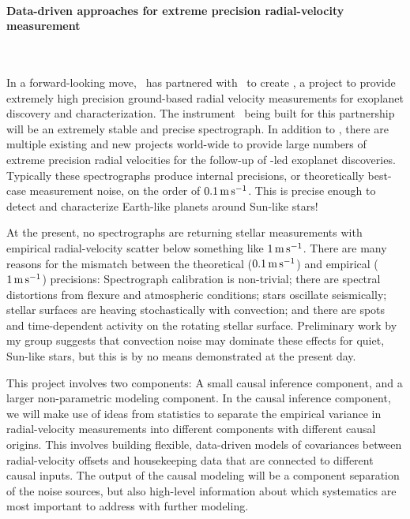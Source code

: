 \documentclass[12pt, fullpage, letterpaper]{article}
\begin{document}
\paragraph{Data-driven approaches for extreme precision radial-velocity measurement}
~

\bigskip
In a forward-looking move, \NASA\ has partnered with \NSF\ to create
\NNEXPLORE, a project to provide extremely high precision ground-based
radial velocity measurements for exoplanet discovery and
characterization. The instrument \NEID\ being built for this
partnership will be an extremely stable and precise spectrograph. In
addition to \NEID, there are multiple existing and new projects
world-wide to provide large numbers of extreme precision radial
velocities for the follow-up of \NASA-led exoplanet
discoveries. Typically these spectrographs produce internal
precisions, or theoretically best-case measurement noise, on the order
of $0.1\,{\mathrm{m\,s^{-1}}}$. This is precise enough to detect and characterize
Earth-like planets around Sun-like stars!

At the present, no spectrographs are returning stellar measurements
with empirical radial-velocity scatter below something like $1\,{\mathrm{m\,s^{-1}}}$.
There are many reasons for the mismatch between the theoretical
($0.1\,{\mathrm{m\,s^{-1}}}$) and empirical ($1\,{\mathrm{m\,s^{-1}}}$) precisions: Spectrograph calibration
is non-trivial; there are spectral distortions from flexure and
atmospheric conditions; stars oscillate seismically; stellar surfaces
are heaving stochastically with convection; and there are spots and
time-dependent activity on the rotating stellar surface. Preliminary
work by my group suggests that convection noise may dominate these
effects for quiet, Sun-like stars, but this is by no means
demonstrated at the present day.

This project involves two components: A small causal inference
component, and a larger non-parametric modeling component. In the
causal inference component, we will make use of ideas from statistics
to separate the empirical variance in radial-velocity measurements
into different components with different causal origins. This involves
building flexible, data-driven models of covariances between
radial-velocity offsets and housekeeping data that are connected to
different causal inputs. The output of the causal modeling will be a
component separation of the noise sources, but also high-level
information about which systematics are most important to address with
further modeling.
\end{document}
